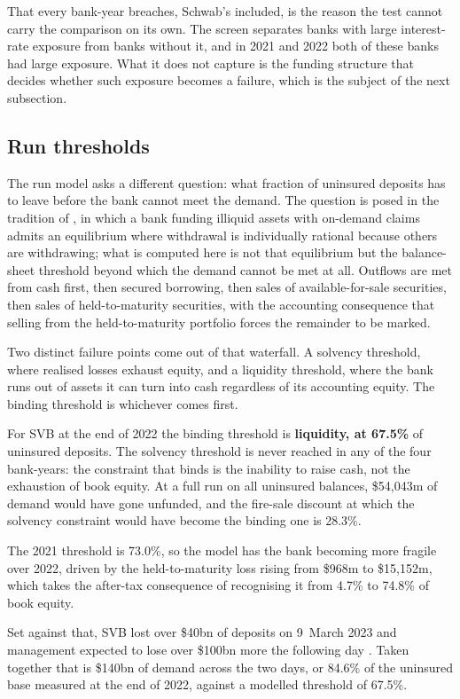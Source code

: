 That every bank-year breaches, Schwab's included, is the reason the test cannot carry
the comparison on its own. The screen separates banks with large interest-rate
exposure from banks without it, and in 2021 and 2022 both of these banks had large
exposure. What it does not capture is the funding structure that decides whether such
exposure becomes a failure, which is the subject of the next subsection.

\subsection{Run thresholds}

The run model asks a different question: what fraction of uninsured deposits has to
leave before the bank cannot meet the demand. The question is posed in the tradition
of \citet{DiamondDybvig1983}, in which a bank funding illiquid assets with
on-demand claims admits an equilibrium where withdrawal is individually rational
because others are withdrawing; what is computed here is not that equilibrium but the
balance-sheet threshold beyond which the demand cannot be met at all. Outflows are
met from cash first, then
secured borrowing, then sales of available-for-sale securities, then sales of
held-to-maturity securities, with the accounting consequence that selling from the
held-to-maturity portfolio forces the remainder to be marked.

Two distinct failure points come out of that waterfall. A solvency threshold, where
realised losses exhaust equity, and a liquidity threshold, where the bank runs out of
assets it can turn into cash regardless of its accounting equity. The binding
threshold is whichever comes first.

For SVB at the end of 2022 the binding threshold is \textbf{liquidity, at 67.5\%} of
uninsured deposits. The solvency threshold is never reached in any of the four
bank-years: the constraint that binds is the inability to raise cash, not the
exhaustion of book equity. At a full run on all uninsured balances, \$54,043m of
demand would have gone unfunded, and the fire-sale discount at which the solvency
constraint would have become the binding one is 28.3\%.

The 2021 threshold is 73.0\%, so the model has the bank becoming more fragile over
2022, driven by the held-to-maturity loss rising from \$968m to \$15,152m, which
takes the after-tax consequence of recognising it from 4.7\% to 74.8\% of book
equity.

Set against that, SVB lost over \$40bn of deposits on 9~March 2023 and management
expected to lose over \$100bn more the following day \citep{FRB2023}. Taken together
that is \$140bn of demand across the two days, or 84.6\% of the uninsured base
measured at the end of 2022, against a modelled threshold of 67.5\%.

